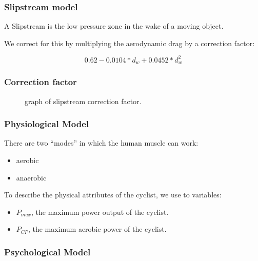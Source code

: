 \documentclass{beamer}
\begin{document}
\begin{frame}
\frametitle{Slipstream model}
\vspace{2cm}
A Slipstream is the low pressure zone in the wake of a moving object. \newline \par
\pause
We correct for this by multiplying the aerodynamic drag by a correction factor:

$$ 0.62 - 0.0104*d_w + 0.0452*d_w^2 $$

\end{frame}

\begin{frame}
\frametitle{Correction factor}
\begin{figure}[ht!]
  \centering
    \scalebox{0.6}{}
  \caption{graph of slipstream correction factor.}
\end{figure}
\end{frame}

\begin{frame}
\frametitle{Physiological Model}

There are two ``modes'' in which the human muscle can work:
\pause
\begin{itemize}
\item aerobic
\item anaerobic
\end{itemize}
\vspace{2cm}
\pause
To describe the physical attributes of the cyclist, we use to variables:
\pause
\begin{itemize}
\item $P_{max}$, the maximum power output of the cyclist.
\pause
\item $P_{CP}$, the maximum aerobic power of the cyclist.
\end{itemize}

\end{frame}

\begin{frame}
\frametitle{Psychological Model}

\end{frame}
\end{document}

